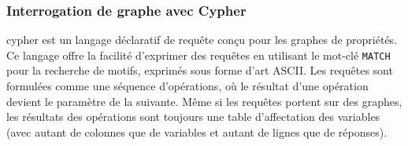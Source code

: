 \subsubsection{Interrogation de graphe avec Cypher}
\gls{cypher} est un langage déclaratif de requête conçu pour les graphes de propriétés.
Ce langage offre la facilité d'exprimer des requêtes en utilisant le mot-clé \verb|MATCH| pour la recherche de motifs, exprimés sous forme d'art ASCII.
Les requêtes sont formulées comme une séquence d'opérations, où le résultat d'une opération devient le paramètre de la suivante.
Même si les requêtes portent sur des graphes, les résultats des opérations sont toujours une table d'affectation des variables (avec autant de colonnes que de variables et autant de lignes que de réponses).

\begin{figure}
    \begin{subfigure}{\linewidth}
        \begin{adjustbox}{width=\linewidth}
\end{adjustbox}
\end{subfigure}
\end{figure}
